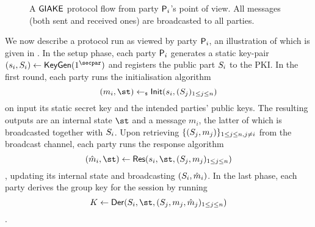 \begin{figure}
	\centering 
	
	\caption{A $\GIAKE$ protocol flow from party $\User[i]$'s point of view. All messages (both sent and received ones) are broadcasted to all parties.}\label{fig:giakeprocedure}
\end{figure}

	We now describe a protocol run as viewed by party $\User[i]$, an illustration of which is given in .
	In the setup phase, each party $\User[i]$ generates a static key-pair $(\ssk_i,\spk_i) \gets \KeyGen(1^\secpar)$ and registers the public part $\spk_i$ to the PKI.
	In the first round, each party runs the initialisation algorithm \[(m_i,\st) \getsr \GAKEIni (\ssk_i,(\spk_j)_{1\leq j \leq n})\] on input its static secret key and the intended parties' public keys. 
	The resulting outputs are an internal state $\st$ and a message $m_i$, the latter of which is broadcasted together with $\spk_i$.
	Upon retrieving $\{(\spk_j,m_j)\}_{1\leq j \leq n, j \neq i}$ from the broadcast channel, each party runs the response algorithm \[(\hat{m}_i,\st) \gets \GAKERes(\ssk_i,\st,(\spk_j,m_j)_{1\leq j \leq n})\], updating its internal state and broadcasting $(\spk_i,\hat{m}_i)$.
	In the last phase, each party derives the group key for the session by running \[K \gets \GAKEDer (\spk_i,\st,(\spk_j,m_j,\hat{m}_j)_{1\leq j \leq n})\].
	
